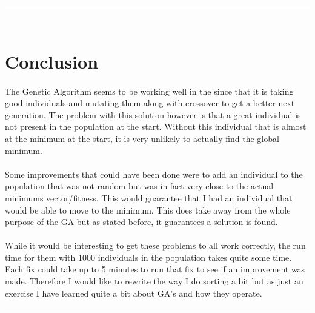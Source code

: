 \documentclass[paper=a4, fontsize=11pt]{scrartcl} %
\numberwithin{equation}{section} %
\numberwithin{figure}{section} %
\numberwithin{table}{section} %
\newcommand{\horrule}[1]{\rule{\linewidth}{#1}} %
\begin{document}

\horrule{0.5pt} \\[0.4cm] %
\section{Conclusion}

\paragraph{} The Genetic Algorithm seems to be working well in the since that it is taking good individuals and mutating them along with crossover to get a better next generation. The problem with this solution however is that a great individual is not present in the population at the start. Without this individual that is almost at the minimum at the start, it is very unlikely to actually find the global minimum.

\paragraph{} Some improvements that could have been done were to add an individual to the population that was not random but was in fact very close to the actual minimums vector/fitness. This would guarantee that I had an individual that would be able to move to the minimum. This does take away from the whole purpose of the GA but as stated before, it guarantees a solution is found.

\paragraph{} While it would be interesting to get these problems to all work correctly, the run time for them with 1000 individuals in the population takes quite some time. Each fix could take up to 5 minutes to run that fix to see if an improvement was made. Therefore I would like to rewrite the way I do sorting a bit but as just an exercise I have learned quite a bit about GA's and how they operate.

\horrule{0.5pt} \\[0.4cm] %
\end{document}
